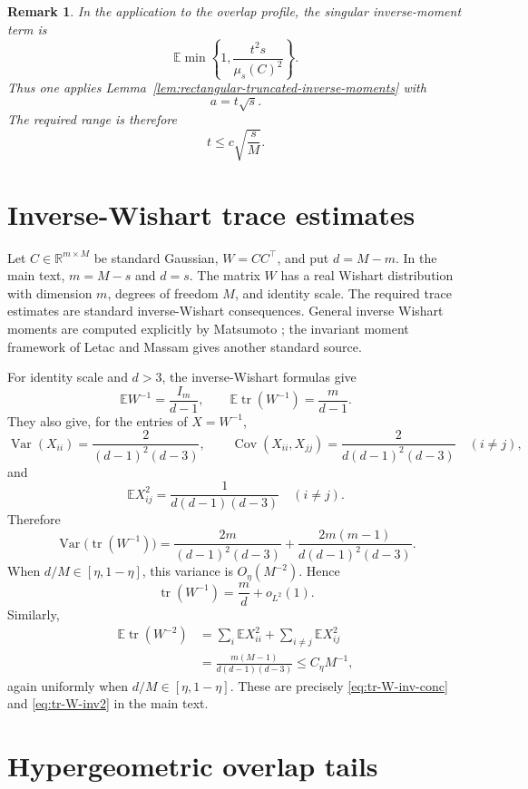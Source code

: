 \documentclass[11pt]{article}
\newtheorem{remark}{Remark}
\DeclareMathOperator{\tr}{tr}
\DeclareMathOperator{\Var}{Var}
\DeclareMathOperator{\Cov}{Cov}
\newcommand{\R}{\mathbb R}
\newcommand{\Ebb}{\mathbb E}
\newcommand{\1}{\mathbf 1}
\begin{document}
\begin{remark}
In the application to the overlap profile, the singular inverse-moment term is
\[
        \Ebb
        \min\left\{
        1,\frac{t^2s}{\mu_s(C)^2}
        \right\}.
\]
Thus one applies Lemma~\ref{lem:rectangular-truncated-inverse-moments} with
\[
        a=t\sqrt{s}.
\]
The required range is therefore
\[
        t\le c\sqrt{\frac{s}{M}}.
\]
\end{remark}

\section{Inverse-Wishart trace estimates}
\label{app:inverse-wishart}

Let \(C\in\R^{m\times M}\) be standard Gaussian, \(W=CC^\top\), and put
\(d=M-m\).  In the main text, \(m=M-s\) and \(d=s\).  The matrix \(W\) has a real
Wishart distribution with dimension \(m\), degrees of freedom \(M\), and identity scale.
The required trace estimates are standard inverse-Wishart consequences.  General inverse
Wishart moments are computed explicitly by Matsumoto \cite{Matsumoto2012}; the invariant
moment framework of Letac and Massam \cite{LetacMassam2004} gives another standard
source.

For identity scale and \(d>3\), the inverse-Wishart formulas give
\[
        \Ebb W^{-1}=\frac{I_m}{d-1},
        \qquad
        \Ebb\tr(W^{-1})=\frac{m}{d-1}.
\]
They also give, for the entries of \(X=W^{-1}\),
\[
        \Var(X_{ii})=\frac{2}{(d-1)^2(d-3)},
        \qquad
        \Cov(X_{ii},X_{jj})=\frac{2}{d(d-1)^2(d-3)}\quad(i\ne j),
\]
and
\[
        \Ebb X_{ij}^2=\frac{1}{d(d-1)(d-3)}\quad(i\ne j).
\]
Therefore
\[
        \Var\bigl(\tr(W^{-1})\bigr)
        =
        \frac{2m}{(d-1)^2(d-3)}
        +
        \frac{2m(m-1)}{d(d-1)^2(d-3)}.
\]
When \(d/M\in[\eta,1-\eta]\), this variance is \(O_\eta(M^{-2})\).  Hence
\[
        \tr(W^{-1})=\frac{m}{d}+o_{L^2}(1).
\]
Similarly,
\begin{align*}
        \Ebb\tr(W^{-2})
        &=\sum_i \Ebb X_{ii}^2+
          \sum_{i\ne j}\Ebb X_{ij}^2 \\
        &=\frac{m(M-1)}{d(d-1)(d-3)}
          \le C_\eta M^{-1},
\end{align*}
again uniformly when \(d/M\in[\eta,1-\eta]\).  These are precisely
\eqref{eq:tr-W-inv-conc} and \eqref{eq:tr-W-inv2} in the main text.

\section{Hypergeometric overlap tails}
\label{app:hypergeometric}
\end{document}
